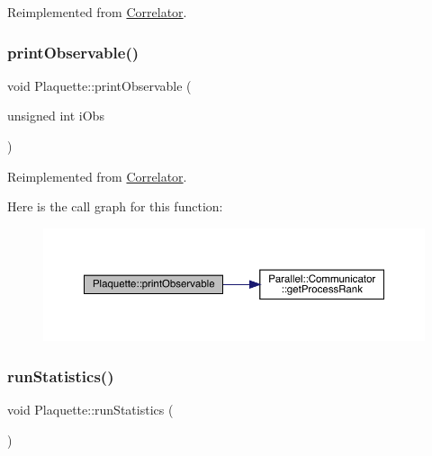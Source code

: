 Reimplemented from \mbox{\hyperlink{class_correlator_ac7c5a07d7cbee97c417a1659b93083b2}{Correlator}}.

\mbox{\label{class_plaquette_aa15bf42749c9fd995d4d572ca3ed4f22}} 
\subsubsection{\texorpdfstring{printObservable()}{printObservable()}}
{\footnotesize\ttfamily void Plaquette\+::print\+Observable (\begin{DoxyParamCaption}\item[{unsigned int}]{i\+Obs }\end{DoxyParamCaption})\hspace{0.3cm}{\ttfamily [virtual]}}



Reimplemented from \mbox{\hyperlink{class_correlator_a15744ddb9f2b71fff34ac762d101df38}{Correlator}}.

Here is the call graph for this function\+:\nopagebreak
\begin{figure}[H]
\begin{center}
\leavevmode
\includegraphics[width=350pt]{class_plaquette_aa15bf42749c9fd995d4d572ca3ed4f22_cgraph}
\end{center}
\end{figure}
\mbox{\label{class_plaquette_aa54bf1807d9b192048026f94d585fa4f}} 
\subsubsection{\texorpdfstring{runStatistics()}{runStatistics()}}
{\footnotesize\ttfamily void Plaquette\+::run\+Statistics (\begin{DoxyParamCaption}{ }\end{DoxyParamCaption})\hspace{0.3cm}{\ttfamily [virtual]}}



